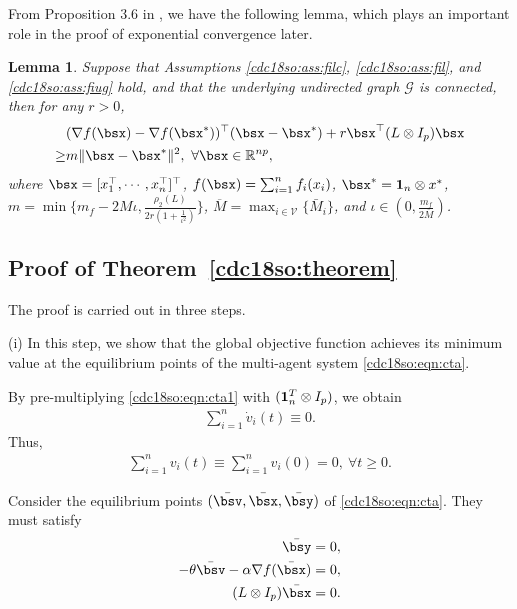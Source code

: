 \documentclass[letterpaper, 10 pt, conference]{ieeeconf}  %
\newtheorem{lemma}{Lemma}
\begin{document}
From Proposition 3.6 in \cite{shi2015extra}, we have the following lemma, which plays an important role in the proof of exponential convergence later.
\begin{lemma}\label{cdc18so:lemma:rsc}
Suppose that Assumptions \ref{cdc18so:ass:filc}, \ref{cdc18so:ass:fil}, and \ref{cdc18so:ass:fiug} hold, and that the underlying undirected graph $\mathcal G$ is connected, then for any $r>0$,
\begin{align*}
&(\nabla f(\bsx)-\nabla f(\bsx^*))^\top(\bsx-\bsx^*)+ r\bsx^\top (L\otimes I_p)\bsx\\
\ge& m\|\bsx-\bsx^*\|^2,~\forall \bsx\in\mathbb{R}^{np},
\end{align*}
where $\bsx=[x_1^\top,\cdots,x_n^\top]^\top$, $f(\bsx)=\sum_{i=1}^nf_i(x_i)$, $\bsx^*={\bf 1}_n \otimes x^*$, $m=\min\Big\{m_f-2M\iota,\frac{\rho_2(L)}{2r(1+\frac{1}{\iota^2})}\Big\}$, $\overline{M}=\max_{i\in\mathcal V}\{\bar{M}_i\}$, and $\iota\in(0,\frac{m_f}{2\overline{M}})$.
\end{lemma}

\subsection{Proof of Theorem~\ref{cdc18so:theorem}}\label{cdc18so:theoremproof}
The proof is carried out in three steps.

(i) In this step, we show that the global objective function achieves its minimum value at the equilibrium points of the multi-agent system \eqref{cdc18so:eqn:cta}.

By pre-multiplying \eqref{cdc18so:eqn:cta1}  with $({\bf 1}^T_n \otimes I_p)$, we obtain
\begin{align*}
\sum_{i=1}^n\dot{v}_i(t)\equiv0.
\end{align*}
Thus,
\begin{align}\label{cdc18so:vsum}
\sum_{i=1}^nv_i(t)\equiv\sum_{i=1}^nv_i(0)=0,~\forall t\ge0.
\end{align}

Consider the equilibrium points $(\bar{\bsv},\bar{\bsx},\bar{\bsy})$ of \eqref{cdc18so:eqn:cta}. They must satisfy
\begin{subequations}\label{cdc18so:ConsCond}
\begin{align}
\bar{\bsy} &=0, \label{cdc18so:ConsCond2}\\
  -\theta \bar{\bsv} - \alpha \nabla f(\bar{\bsx}) &=0, \label{cdc18so:ConsCond3}\\
  (L \otimes I_p)\bar{\bsx} &=0. \label{cdc18so:ConsCond1}
\end{align}
\end{subequations}
\end{document}
